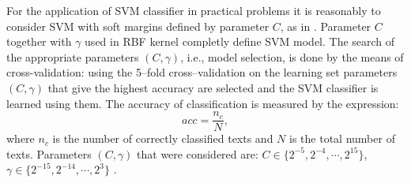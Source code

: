 \documentclass{llncs}
\begin{document}

For the application of SVM classifier in practical problems it is reasonably to
consider SVM with soft margins defined by parameter $C$, as in 
\cite{cortes1995support}. Parameter $C$ together with $\gamma$ used in RBF
kernel completly define SVM model. The search of the appropriate parameters
$(C, \gamma)$, i.e., model selection, is done by the means of cross-validation:
using the 5--fold cross--validation on the learning set parameters $(C, \gamma)$ that give the highest accuracy are selected and the SVM classifier is learned using them. The accuracy of classification is measured by the expression:
\begin{equation}
acc = \frac{n_c}{N}, %
\end{equation}
where $n_c$ is the number of correctly classified texts and $N$ is the total number of
texts.
Parameters $(C, \gamma)$ that were considered are: $C \in \{2^{-5}, 2^{-4},
\cdots , 2^{15}\}$, $\gamma \in \{2^{-15}, 2^{-14}, \cdots, 2^3\}$ \cite{CC01a}.
\end{document}
